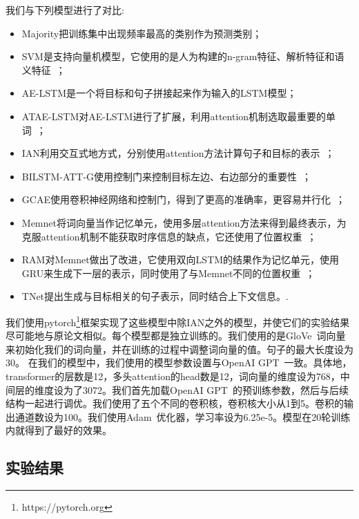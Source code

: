 我们与下列模型进行了对比:
\begin{itemize}
    \item Majority把训练集中出现频率最高的类别作为预测类别；
    \item SVM是支持向量机模型，它使用的是人为构建的n-gram特征、解析特征和语义特征~\cite{kiritchenko2014nrc-canada-2014}；
    \item AE-LSTM是一个将目标和句子拼接起来作为输入的LSTM模型；
    \item ATAE-LSTM对AE-LSTM进行了扩展，利用attention机制选取最重要的单词~\cite{wang2016attention-based}；
    \item IAN利用交互式地方式，分别使用attention方法计算句子和目标的表示~\cite{ma2017interactive}；
    \item BILSTM-ATT-G使用控制门来控制目标左边、右边部分的重要性~\cite{liu2017attention}；
    \item GCAE使用卷积神经网络和控制门，得到了更高的准确率，更容易并行化~\cite{xue2018aspect}；
    \item {Memnet}将词向量当作记忆单元，使用多层attention方法来得到最终表示，为克服attention机制不能获取时序信息的缺点，它还使用了位置权重~\cite{tang2016aspect}；
    \item RAM对Memnet做出了改进，它使用双向LSTM的结果作为记忆单元，使用GRU来生成下一层的表示，同时使用了与Memnet不同的位置权重~\cite{Al2017Deep}；
    \item TNet提出生成与目标相关的句子表示，同时结合上下文信息。\cite{Xin2018Transformation}.
\end{itemize}
我们使用pytorch\footnote{https://pytorch.org}框架实现了这些模型中除IAN之外的模型，并使它们的实验结果尽可能地与原论文相似。每个模型都是独立训练的。我们使用的是GloVe~\cite{pennington2014glove}词向量来初始化我们的词向量，并在训练的过程中调整词向量的值。句子的最大长度设为30。
在我们的模型中，我们使用的模型参数设置与OpenAI GPT~\cite{radford2018improving}一致。具体地，transformer的层数是12，多头attention的head数是12，词向量的维度设为768，中间层的维度设为了3072。我们首先加载OpenAI GPT~\cite{radford2018improving}的预训练参数，然后与后续结构一起进行调优。我们使用了五个不同的卷积核，卷积核大小从1到5。卷积的输出通道数设为100。我们使用Adam~\cite{kingma2014adam}优化器，学习率设为6.25e-5。模型在20轮训练内就得到了最好的效果。
\subsection{实验结果}

